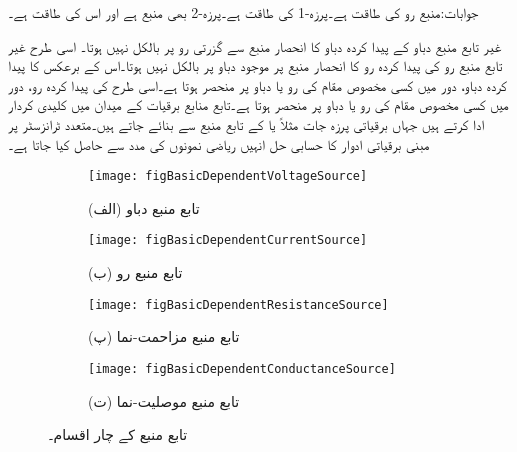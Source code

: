 جوابات:منبع رو کی طاقت  ہے۔پرزہ-1 کی طاقت  ہے۔پرزہ-2 بھی منبع ہے اور اس کی طاقت  ہے۔

غیر تابع منبع دباو کے پیدا کردہ دباو کا انحصار منبع سے گزرتی رو پر بالکل نہیں ہوتا۔ اسی طرح غیر تابع منبع رو کی پیدا کردہ رو کا انحصار منبع پر موجود دباو پر بالکل نہیں ہوتا۔اس کے برعکس  کا پیدا کردہ دباو،  دور میں کسی مخصوص مقام کی رو یا دباو پر منحصر ہوتا ہے۔اسی طرح  کی پیدا کردہ رو،  دور میں کسی مخصوص مقام کی رو یا دباو پر منحصر ہوتا ہے۔تابع منابع برقیات کے میدان میں کلیدی کردار ادا کرتے ہیں جہاں برقیاتی پرزہ جات مثلاً  یا  کے   تابع منبع سے بنائے جاتے ہیں۔متعدد ٹرانزسٹر پر مبنی برقیاتی ادوار کا حسابی حل انہیں ریاضی نمونوں کی مدد سے حاصل کیا جاتا ہے۔

\begin{figure}
\centering
\begin{subfigure}{0.5\textwidth}
\centering
\texttt{[image: figBasicDependentVoltageSource]}
\caption*{(الف) تابع منبع دباو}
\end{subfigure}%
\begin{subfigure}{0.5\textwidth}
\centering
\texttt{[image: figBasicDependentCurrentSource]}
\caption*{(ب) تابع منبع رو}
\end{subfigure}
%
\begin{subfigure}{0.5\textwidth}
\centering
\texttt{[image: figBasicDependentResistanceSource]}
\caption*{(پ) تابع منبع مزاحمت-نما}
\end{subfigure}%
\begin{subfigure}{0.5\textwidth}
\centering
\texttt{[image: figBasicDependentConductanceSource]}
\caption*{(ت) تابع منبع موصلیت-نما}
\end{subfigure}%
\caption{تابع منبع کے چار اقسام۔}
\label{شکل_بنیادی_تابع_منبع_اقسام}
\end{figure}

